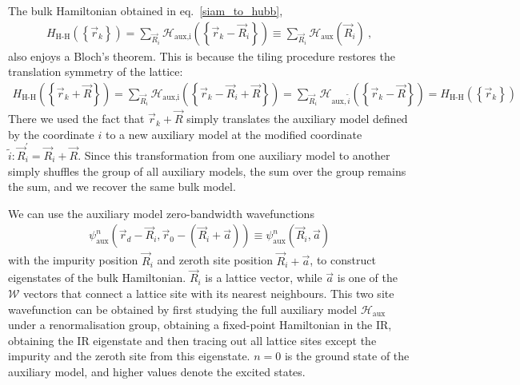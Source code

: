 \documentclass[prb]{revtex4-2}
\begin{document}
The bulk Hamiltonian obtained in eq.~\ref{siam_to_hubb},
\begin{equation}\begin{aligned}
	H_\text{H-H}\left(\left\{\vec r_k\right\}\right) = \sum_{\vec R_i} \mathcal{H}_\text{aux,i}\left(\left\{\vec r_k - \vec R_i\right\}\right) \equiv \sum_{\vec R_i} \mathcal{H}_\text{aux}\left(\vec R_i\right)~,
\end{aligned}\end{equation}
also enjoys a Bloch's theorem. This is because the tiling procedure restores the translation symmetry of the lattice:
\begin{equation}\begin{aligned}
	H_\text{H-H}\left(\left\{\vec r_k + \vec R\right\}\right) =  \sum_{\vec R_i}\mathcal{H}_\text{aux,i}\left(\left\{\vec r_k - \vec R_i + \vec R\right\}\right) = \sum_{\vec R_i} \mathcal{H}_{\text{aux},\tilde i}\left(\left\{\vec r_k - \vec R\right\}\right) = H_\text{H-H}(\left\{\vec r_k\right\})
\end{aligned}\end{equation}
There we used the fact that \(\vec r_k + \vec R\) simply translates the auxiliary model defined by the coordinate \(i\) to a new auxiliary model at the modified coordinate \(\tilde i: \vec R_i^\prime = \vec R_i + \vec R\). Since this transformation from one auxiliary model to another simply shuffles the group of all auxiliary models, the sum over the group remains the sum, and we recover the same bulk model.

We can use the auxiliary model zero-bandwidth wavefunctions 
\begin{equation}\begin{aligned}
\psi^n_\text{aux}\left(\vec r_d - \vec R_i, \vec r_0 - \left(\vec R_i + \vec a\right)  \right) \equiv \psi^n_\text{aux}\left(\vec R_i, \vec a\right)
\end{aligned}\end{equation}
with the impurity position \(\vec R_i\) and zeroth site position \(\vec R_i + \vec a\), to construct eigenstates of the bulk Hamiltonian. \(\vec R_i\) is a lattice vector, while \(\vec a\) is one of the \(\mathcal{W}\) vectors that connect a lattice site with its nearest neighbours. This two site wavefunction can be obtained by first studying the full auxiliary model \(\mathcal{H}_\text{aux}\) under a renormalisation group, obtaining a fixed-point Hamiltonian in the IR, obtaining the IR eigenstate and then tracing out all lattice sites except the impurity and the zeroth site from this eigenstate. \(n=0\) is the ground state of the auxiliary model, and higher values denote the excited states.
\end{document}
